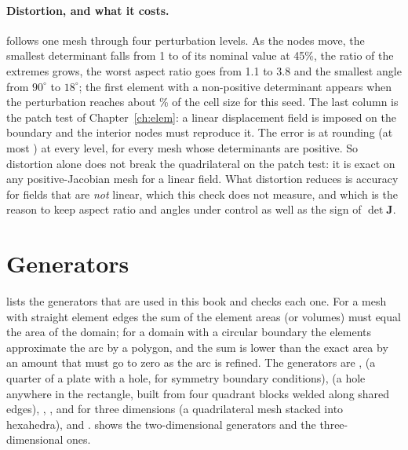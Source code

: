 \paragraph{Distortion, and what it costs.}  follows one mesh through four perturbation levels. As the nodes move, the smallest determinant falls from 1 to \cmeQMinDetHi{} of its nominal value at 45\%, the ratio of the extremes grows, the worst aspect ratio goes from 1.1 to 3.8 and the smallest angle from $90^\circ$ to $18^\circ$; the first element with a non-positive determinant appears when the perturbation reaches about \cmeQFirstBad\% of the cell size for this seed. The last column is the patch test of Chapter~\ref{ch:elem}: a linear displacement field is imposed on the boundary and the interior nodes must reproduce it. The error is at rounding (at most \cmeQPatchMax) at every level, for every mesh whose determinants are positive. So distortion alone does not break the quadrilateral on the patch test: it is exact on any positive-Jacobian mesh for a linear field. What distortion reduces is accuracy for fields that are \emph{not} linear, which this check does not measure, and which is the reason to keep aspect ratio and angles under control as well as the sign of $\det\bm J$.

\begin{table}[ht]
\centering\small

\caption{One $14\times8$ mesh at four perturbation levels (one random seed). The determinant is relative to the undistorted element. The patch error is the largest nodal error of a linear field, relative to the largest displacement.}\label{tab:me-quality}
\end{table}

\section{Generators}\label{sec:me-gen}

 lists the generators that are used in this book and checks each one. For a mesh with straight element edges the sum of the element areas (or volumes) must equal the area of the domain; for a domain with a circular boundary the elements approximate the arc by a polygon, and the sum is lower than the exact area by an amount that must go to zero as the arc is refined. The generators are ,  (a quarter of a plate with a hole, for symmetry boundary conditions),  (a hole anywhere in the rectangle, built from four quadrant blocks welded along shared edges), , , and for three dimensions  (a quadrilateral mesh stacked into hexahedra),  and .  shows the two-dimensional generators and  the three-dimensional ones.


